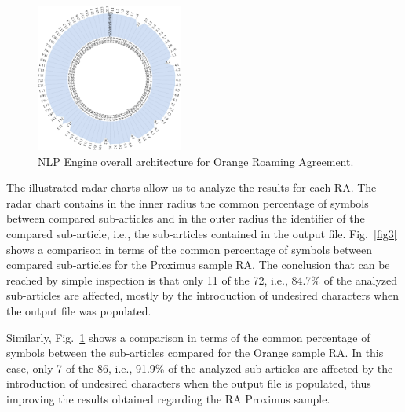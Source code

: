 \begin{figure}[htbp]
\centerline{\includegraphics[width=0.43\textwidth]{images/Orange.png}}
\caption{NLP Engine overall architecture for Orange Roaming Agreement.}
\label{fig4}
\end{figure}

The illustrated radar charts allow us to analyze the results for each RA. The radar chart contains in the inner radius the common percentage of symbols between compared sub-articles and in the outer radius the identifier of the compared sub-article, i.e., the sub-articles contained in the output file. Fig.~\ref{fig3} shows a comparison in terms of the common percentage of symbols between compared sub-articles for the Proximus sample RA. The conclusion that can be reached by simple inspection is that only 11 of the 72, i.e.,  84.7\% of the analyzed sub-articles are affected, mostly by the introduction of undesired characters when the output file was populated.

Similarly, Fig.~\ref{fig4} shows a comparison in terms of the common percentage of symbols between the sub-articles compared for the Orange sample RA. In this case, only 7 of the 86, i.e., 91.9\% of the analyzed sub-articles are affected by the introduction of undesired characters when the output file is populated, thus improving the results obtained regarding the RA Proximus sample.


